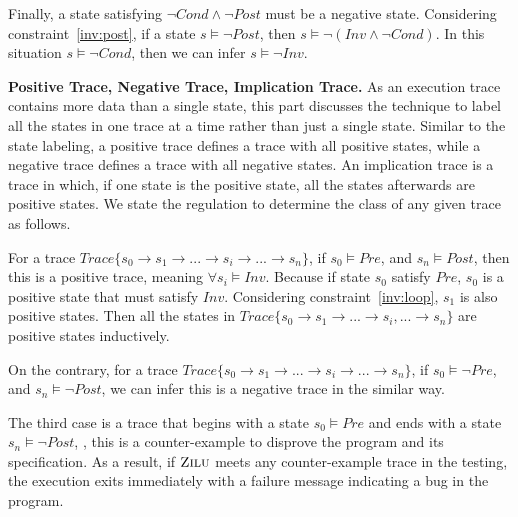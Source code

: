 Finally, a state satisfying $\neg{Cond} \wedge \neg{Post}$ must be a negative state.
Considering constraint~\ref{inv:post}, if a state $s \models \neg{Post}$,
then $s \models \neg(Inv \wedge \neg Cond)$.
In this situation $s \models \neg Cond$, then we can infer $s \models \neg Inv$. 

\medskip\noindent
\textbf{Positive Trace, Negative Trace, Implication Trace.}
As an execution trace contains more data than a single state,
this part discusses the technique to label all the states in one trace at a time rather than just a single state.
Similar to the state labeling, a positive trace defines a trace with all positive states,
while a negative trace defines a trace with all negative states.
An implication trace is a trace in which, if one state is the positive state, 
all the states afterwards are positive states.
We state the regulation to determine the class of any given trace as follows.

For a trace $Trace\{s_0 \to s_1 \to ... \to s_i \to ... \to s_n\}$, 
if $s_0 \models Pre$, and $s_n \models Post$,
then this is a positive trace, meaning $\forall s_i \models Inv$.
Because if state $s_0$ satisfy $Pre$,
$s_0$ is a positive state that must satisfy $Inv$. %
Considering constraint~\ref{inv:loop}, $s_1$ is also positive states.
Then all the states in $Trace\{s_0 \to s_1 \to ...\to s_i, ... \to s_n\}$ are positive states inductively. 

On the contrary, for a trace $Trace\{s_0 \to s_1 \to ...\to s_i \to ... \to s_n\}$, 
if $s_0 \models \neg Pre$, and $s_n \models \neg Post$,
we can infer this is a negative trace in the similar way. 


The third case is a trace that begins with a state $s_0 \models Pre$ and ends with a state $s_n \models \neg Post$,
, this is a counter-example to disprove the program and its specification.
As a result, if $\textsc{Zilu}$ meets any counter-example trace in the testing, 
the execution exits immediately with a failure message indicating a bug in the program. 

